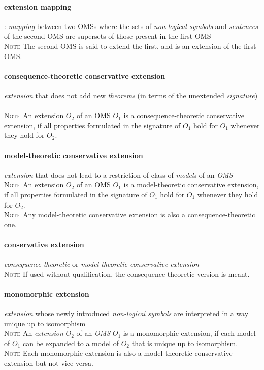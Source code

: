 \documentclass[10pt,%
\ifpretendfinal
final%
\else
draft%
\fi,
]{scrreprt}
\newcommand*{\termref}[1]{\textit{#1}}
\newcommand{\termdefinition}[2]{\paragraph{#1} #2}
\newenvironment{definitions}[0]{\medskip }{}
\newenvironment{note}[0]{\ \\ \textsc{Note} \quad}{}
\begin{document}
\begin{definitions}
   \termdefinition{extension mapping}: \termref{mapping} between two
   OMSs where the sets of \termref{non-logical symbols} and
   \termref{sentences} of the second OMS are supersets of those
   present in the first OMS 
\begin{note} 
The second OMS is said to extend the first, and is an extension of the
first OMS.
\end{note} 

  \termdefinition{consequence-theoretic conservative extension}{\termref{extension} that does
   not add new \termref{theorems} (in terms of the unextended \termref{signature})}
  \begin{note}
    An extension $O_2$ of an OMS $O_1$ is a consequence-theoretic conservative extension, if all properties formulated in the signature of $O_1$ hold for $O_1$ whenever they hold for $O_2$.
  \end{note}

  \termdefinition{model-theoretic conservative extension}{\termref{extension}
   that does not lead to a restriction of class of \termref{model}s of an \termref{OMS}}
  \begin{note}
    An extension $O_2$ of an OMS $O_1$ is a model-theoretic conservative extension, if all properties formulated in the signature of $O_1$ hold for $O_1$ whenever they hold for $O_2$.
  \end{note}
  \begin{note}
   Any model-theoretic conservative extension is also a consequence-theoretic one.
  \end{note}

  \termdefinition{conservative extension}{\termref{consequence-theoretic} or \termref{model-theoretic conservative extension}}
  \begin{note}
   If used without qualification, the consequence-theoretic version is meant.
  \end{note}

  \termdefinition{monomorphic extension}{\termref{extension} whose newly introduced
   \termref{non-logical symbols} are interpreted in a way unique up to isomorphism}
  \begin{note}
An \termref{extension} $O_2$ of an \termref{OMS} $O_1$ is a monomorphic extension, if each model of $O_1$ can be expanded to a model of $O_2$ that is unique up to isomorphism.
  \end{note}
  \begin{note}
    Each monomorphic extension is also a model-theoretic conservative extension but not vice versa.
  \end{note}


\end{definitions}
\end{document}

